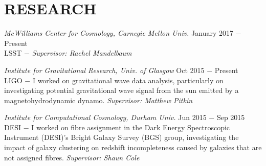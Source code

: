 \section{RESEARCH}

{\sl McWilliams Center for Cosmology, Carnegie Mellon Univ.} \hfill January 2017 $-$ Present \\

\hspace{3 mm} LSST $-$
\emph{Supervisor: Rachel Mandelbaum}


{\sl Institute for Gravitational Research, Univ. of Glasgow} \hfill Oct 2015 $-$ Present \\

\hspace{3 mm} LIGO $-$ I worked on gravitational wave data analysis, particularly on investigating potential gravitational wave signal from the sun emitted by a magnetohydrodynamic dynamo. \emph{Supervisor: Matthew Pitkin}


{\sl Institute for Computational Cosmology, Durham Univ.} \hfill Jun 2015 $-$ Sep 2015 \\

\hspace{3 mm} DESI $-$ I worked on fibre assignment in the Dark Energy Spectroscopic Instrument (DESI)'s Bright Galaxy Survey (BGS) group, investigating the impact of galaxy clustering on redshift incompleteness caused by galaxies that are not assigned fibres. \emph{Supervisor: Shaun Cole}
 
